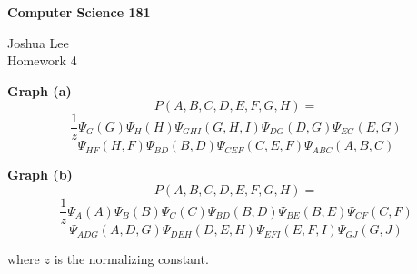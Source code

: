 \documentclass[12pt]{article}
\begin{document}
\begin{center}
\large
\textbf{Computer Science 181} \\
\medskip

Joshua Lee\\
Homework 4\end{center}

\textbf{Graph (a)}
$$
P(A, B, C, D, E, F, G, H) =
$$
$$
\frac{1}{z}
\Psi_{G}(G)
\Psi_{H}(H)
\Psi_{GHI}(G,H,I)
\Psi_{DG}(D,G)
\Psi_{EG}(E,G)
$$
$$
\Psi_{HF}(H,F)
\Psi_{BD}(B,D)
\Psi_{CEF}(C,E,F)
\Psi_{ABC}(A,B,C)
$$

\textbf{Graph (b)}
$$
P(A, B, C, D, E, F, G, H) =
$$
$$
\frac{1}{z}
\Psi_{A}(A)
\Psi_{B}(B)
\Psi_{C}(C)
\Psi_{BD}(B,D)
\Psi_{BE}(B,E)
\Psi_{CF}(C,F)
$$
$$
\Psi_{ADG}(A,D,G)
\Psi_{DEH}(D,E,H)
\Psi_{EFI}(E,F,I)
\Psi_{GJ}(G,J)
$$

where $z$ is the normalizing constant.
\end{document}
